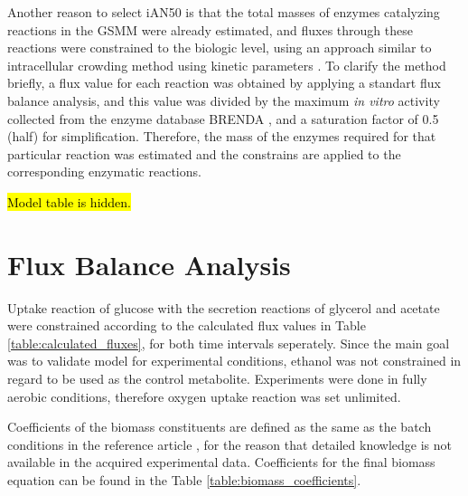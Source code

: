 Another reason to select iAN50 is that the total masses of enzymes catalyzing reactions in the GSMM were already estimated, and fluxes through these reactions were constrained to the biologic level, using an approach similar to intracellular crowding method using kinetic parameters \cite{beg2007intracellular, adadi2012prediction}. To clarify the method briefly, a flux value for each reaction was obtained by applying a standart flux balance analysis, and this value was divided by the maximum \emph{in vitro} activity collected from the enzyme database BRENDA \cite{schomburg2012brenda}, and a saturation factor of 0.5 (half) for simplification. Therefore, the mass of the enzymes required for that particular reaction was estimated and the constrains are applied to the corresponding enzymatic reactions.

\hl{Model table is hidden.}
%

\section{Flux Balance Analysis}
Uptake reaction of glucose with the secretion reactions of glycerol and acetate were constrained according to the calculated flux values in Table \ref{table:calculated_fluxes}, for both time intervals seperately. Since the main goal was to validate model for experimental conditions, ethanol was not constrained in regard to be used as the control metabolite. Experiments were done in fully aerobic conditions, therefore oxygen uptake reaction was set unlimited.

Coefficients of the biomass constituents are defined as the same as the batch conditions in the reference article \cite{nilsson2016metabolic}, for the reason that detailed knowledge is not available in the acquired experimental data. Coefficients for the final biomass equation can be found in the Table \ref{table:biomass_coefficients}.

